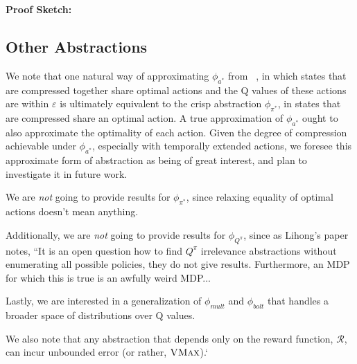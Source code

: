 {\bf Proof Sketch:}












\subsection{Other Abstractions}

We note that one natural way of approximating $\phi_{a^*}$ from ~\cite{li2006towards}, in which states that are compressed together share optimal actions and the Q values of these actions are within $\varepsilon$ is ultimately equivalent to the crisp abstraction $\phi_{\pi^*}$, in states that are compressed share an optimal action. A true approximation of $\phi_{a^*}$ ought to also approximate the optimality of each action. Given the degree of compression achievable under $\phi_{a^*}$, especially with temporally extended actions, we foresee this approximate form of abstraction as being of great interest, and plan to investigate it in future work.

We are {\it not} going to provide results for $\phi_{\pi^*}$, since relaxing equality of optimal actions doesn't mean anything.

Additionally, we are {\it not} going to provide results for $\phi_{Q^\pi}$, since as Lihong's paper notes, ``It is an open question how to find $Q^\pi$ irrelevance abstractions without enumerating all possible policies, they do not give results. Furthermore, an MDP for which this is true is an awfully weird MDP...

Lastly, we are interested in a generalization of $\phi_{mult}$  and $\phi_{bolt}$ that handles a broader space of distributions over Q values.

We also note that any abstraction that depends only on the reward function, $\mathcal{R}$, can incur unbounded error (or rather, $\textsc{VMax}$).`



